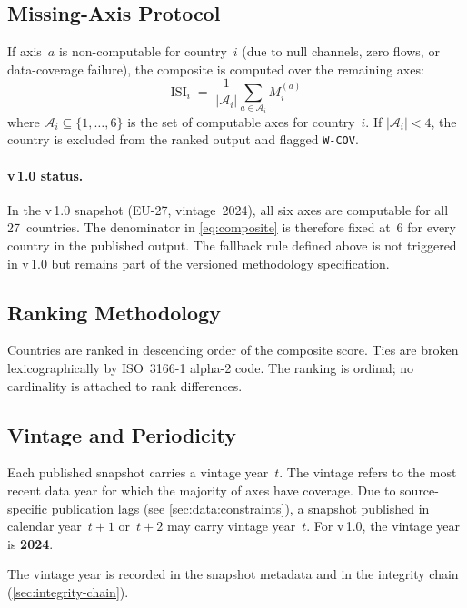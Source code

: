 \subsection{Missing-Axis Protocol}\label{sec:agg:missing}

If axis~\(a\) is non-computable for country~\(i\) (due to null channels,
zero flows, or data-coverage failure), the composite is computed over the
remaining axes:
%
\begin{equation}\label{eq:composite-partial}
  \mathrm{ISI}_i
  \;=\;
  \frac{1}{|\mathcal{A}_i|}
  \sum_{a \in \mathcal{A}_i} M_i^{(a)}
\end{equation}
%
where \(\mathcal{A}_i \subseteq \{1, \ldots, 6\}\) is the set of computable
axes for country~\(i\).  If \(|\mathcal{A}_i| < 4\), the country is excluded
from the ranked output and flagged \texttt{W-COV}.

\paragraph{v\,1.0 status.}
In the \ISI v\,1.0 snapshot (EU-27, vintage~2024), all six axes are computable
for all 27~countries.  The denominator in \cref{eq:composite} is therefore
fixed at~6 for every country in the published output.  The fallback rule
defined above is not triggered in v\,1.0 but remains part of the versioned
methodology specification.

\subsection{Ranking Methodology}\label{sec:agg:ranking}

Countries are ranked in descending order of the composite score.  Ties are
broken lexicographically by ISO~3166-1 alpha-2 code.  The ranking is ordinal;
no cardinality is attached to rank differences.

\subsection{Vintage and Periodicity}\label{sec:agg:vintage}

Each published snapshot carries a vintage year~\(t\).  The vintage refers to
the most recent data year for which the majority of axes have coverage.  Due
to source-specific publication lags (see \cref{sec:data:constraints}), a
snapshot published in calendar year~\(t + 1\) or~\(t + 2\) may carry vintage
year~\(t\).  For v\,1.0, the vintage year is \textbf{2024}.

The vintage year is recorded in the snapshot metadata and in the integrity
chain (\cref{sec:integrity-chain}).